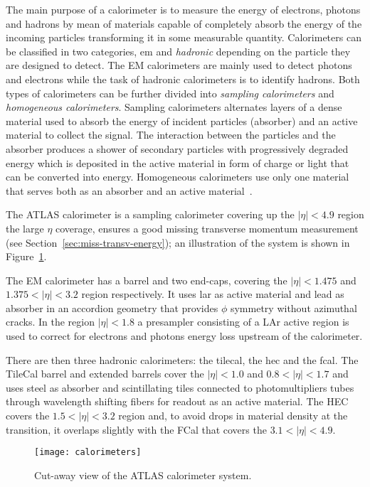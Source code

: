 The main purpose of a calorimeter is to measure the energy of electrons, photons
and hadrons by mean of materials capable of completely absorb the energy of the
incoming particles transforming it in some measurable quantity. Calorimeters can
be classified in two categories, \gls{em} and \emph{hadronic} depending on the
particle they are designed to detect. The EM calorimeters are mainly used to
detect photons and electrons while the task of hadronic calorimeters is to
identify hadrons. Both types of calorimeters can be further divided into
\emph{sampling calorimeters} and \emph{homogeneous calorimeters}. Sampling
calorimeters alternates layers of a dense material used to absorb the energy of
incident particles (absorber) and an active material to collect the signal. The
interaction between the particles and the absorber produces a shower of
secondary particles with progressively degraded energy which is deposited in the
active material in form of charge or light that can be converted into
energy. Homogeneous calorimeters use only one material that serves both as an
absorber and an active material~\cite{Calorimetry}.

The ATLAS calorimeter is a sampling calorimeter covering up the $|\eta| < 4.9$
region the large $\eta$ coverage, ensures a good missing transverse momentum
measurement (see Section~\ref{sec:miss-transv-energy}); an illustration of the
system is shown in Figure~\ref{fig:calo}.

The EM calorimeter has a barrel and two end-caps, covering the $|\eta| < 1.475$
and $1.375 < |\eta| < 3.2$ region respectively. It uses \gls{lar} as active
material and lead as absorber in an accordion geometry that provides $\phi$
symmetry without azimuthal cracks. In the region $|\eta| < 1.8$ a presampler
consisting of a LAr active region is used to correct for electrons and photons
energy loss upstream of the calorimeter.

There are then three hadronic calorimeters: the \gls{tilecal}, the \gls{hec} and
the \gls{fcal}. The TileCal barrel and extended barrels cover the $|\eta| < 1.0$
and $0.8 < |\eta| < 1.7$ and uses steel as absorber and scintillating tiles
connected to photomultipliers tubes through wavelength shifting fibers for
readout as an active material. The HEC covers the $1.5 < |\eta| < 3.2$ region
and, to avoid drops in material density at the transition, it overlaps slightly
with the FCal that covers the $3.1 < |\eta| < 4.9$.

\begin{figure}[!h]
  \centering
    \texttt{[image: calorimeters]}
    \caption{Cut-away view of the ATLAS calorimeter system.}
    \label{fig:calo}
\end{figure}
